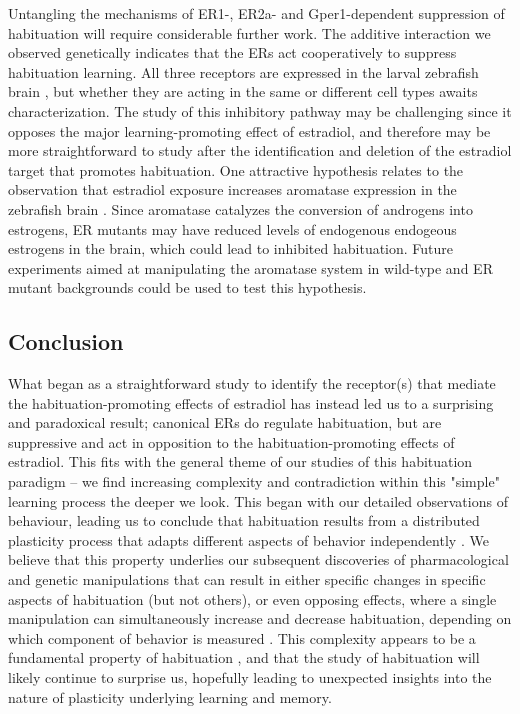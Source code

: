 \documentclass[9.5pt,lineno]{RandlettLab_elife}
\begin{document}
{Untangling the mechanisms of ER1-, ER2a- and Gper1-dependent suppression of habituation will require considerable further work. 
The additive interaction we observed genetically indicates that the ERs act cooperatively to suppress habituation learning.
All three receptors are expressed in the larval zebrafish brain \citep{Thisse2008-vr,Romano2017-ep}, but whether they are acting in the same or different cell types awaits characterization. 
The study of this inhibitory pathway may be challenging since it opposes the major learning-promoting effect of estradiol, and therefore may be more straightforward to study after the identification and deletion of the estradiol target that promotes habituation. 
One attractive hypothesis relates to the observation that estradiol exposure increases aromatase expression in the zebrafish brain \citep{Menuet2005-hn, Hao2013-ik}. 
Since aromatase catalyzes the conversion of androgens into estrogens, ER mutants may have reduced levels of endogenous endogeous estrogens in the brain, which could lead to inhibited habituation.
Future experiments aimed at manipulating the aromatase system in wild-type and ER mutant backgrounds could be used to test this hypothesis. 

\subsection{Conclusion}

What began as a straightforward study to identify the receptor(s) that mediate the habituation-promoting effects of estradiol has instead led us to a surprising and paradoxical result; 
canonical ERs do regulate habituation, but are suppressive and act in opposition to the habituation-promoting effects of estradiol. 
This fits with the general theme of our studies of this habituation paradigm -- we find increasing complexity and contradiction within this "simple" learning process the deeper we look. 
This began with our detailed observations of behaviour, leading us to conclude that habituation results from a distributed plasticity process that adapts different aspects of behavior independently \citep{Randlett2019-fj}. 
We believe that this property underlies our subsequent discoveries of pharmacological and genetic manipulations that can result in either specific changes in specific aspects of habituation (but not others), or even opposing effects, where a single manipulation can simultaneously increase and decrease habituation, depending on which component of behavior is measured \citep{Randlett2019-fj,Lamire2023-he}.
This complexity appears to be a fundamental property of habituation \citep{McDiarmid2019-td}, and that the study of habituation will likely continue to surprise us, hopefully leading to unexpected insights into the nature of plasticity underlying learning and memory.

}
\end{document}
